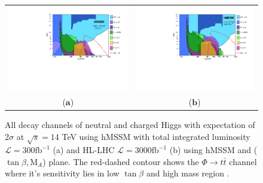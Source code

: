 \begin{figure}[htp]
\centering
\begin{tabular}{cc}
\hspace{-0.3cm}
\includegraphics[trim={8cm 6.0cm 0 0},clip, scale=0.4]{fig/chapt2/httplots_constraints_LHC14_300fb_all.png}
& \hspace{-2.4cm} \includegraphics[trim={8cm 6.0cm 0 0},clip, scale=0.4]{fig/chapt2/httplots_constraints_LHC14_3000fb_all.png}\\
  \qquad ($\mathbf{a}$)\qquad\qquad&($\mathbf{b}$)\qquad\qquad\qquad\qquad \\
\end{tabular}
\caption{All decay channels of neutral and charged Higgs with expectation of 2$\sigma$ at $\sqrt{s}=14$ TeV using hMSSM with total integrated luminosity $\mathcal{L}=300 \text{f}\text{b}^{-1}$ (a) and  HL-LHC $\mathcal{L}=3000 \text{f}\text{b}^{-1}$ (b) using hMSSM and ($\tan\beta, \text{M}_{A}$) plane. The red-dashed contour shows the $\Phi\rightarrow t\bar{t}$ channel where it's sensitivity lies in low $\tan\beta$ and high mass region \cite{Djouadi:2015jea}. }\label{fig:Heavy}
\end{figure}
   
\clearpage{\pagestyle{empty}\cleardoublepage}
